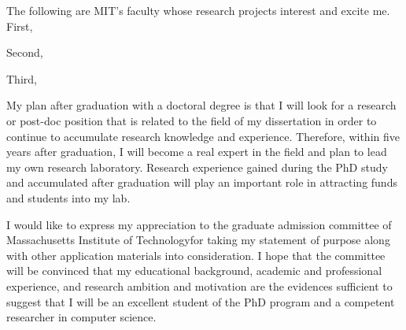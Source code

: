 \documentclass[a4paper,10pt]{report}
\newcommand{\university}{Massachusetts Institute of Technology}
\newcommand{\uniabbre}{MIT}
\begin{document}
\vspace{0.2cm}
The following are \uniabbre's faculty whose research projects interest and excite me. First, 

\vspace{0.2cm}
Second, 

\vspace{0.2cm}
Third, 

\vspace{0.2cm}
My plan after graduation with a doctoral degree is that I will look for a research or post-doc position that is related to the field of my dissertation in order to continue to accumulate research knowledge and experience. Therefore, within five years after graduation, I will become a real expert in the field and plan to lead my own research laboratory. Research experience gained during the PhD study and accumulated after graduation will play an important role in attracting funds and students into my lab.

\vspace{0.2cm}
I would like to express my appreciation to the graduate admission committee of \university \space for taking my statement of purpose along with other application materials into consideration. I hope that the committee will be convinced that my educational background, academic and professional experience, and research ambition and motivation are the evidences sufficient to suggest that I will be an excellent student of the PhD program and a competent researcher in computer science.
\end{document}
